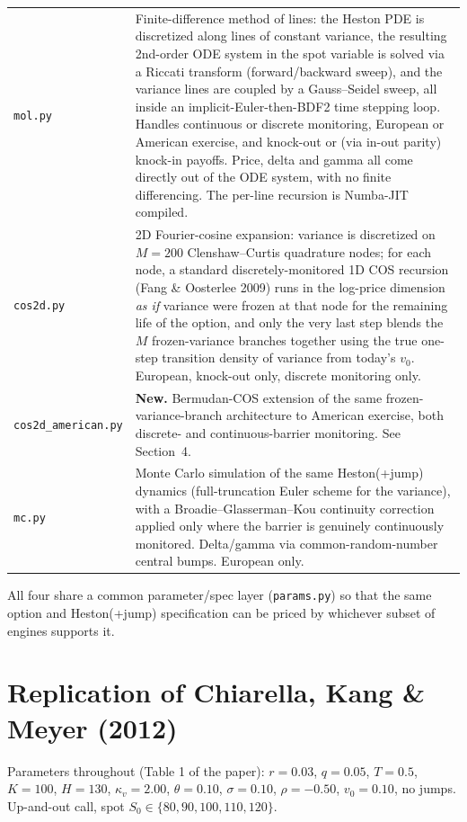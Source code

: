 \documentclass[11pt]{article}
\begin{document}
\begin{tabular}{@{}p{}p{}@{}}
\texttt{mol.py} & Finite-difference method of lines: the Heston PDE is
discretized along lines of constant variance, the resulting 2nd-order ODE
system in the spot variable is solved via a Riccati transform
(forward/backward sweep), and the variance lines are coupled by a
Gauss--Seidel sweep, all inside an implicit-Euler-then-BDF2 time stepping
loop. Handles continuous or discrete monitoring, European or American
exercise, and knock-out or (via in-out parity) knock-in payoffs. Price, delta
and gamma all come directly out of the ODE system, with no finite
differencing. The per-line recursion is Numba-JIT compiled. \\[0.5em]
\texttt{cos2d.py} & 2D Fourier-cosine expansion: variance is discretized on
$M{=}200$ Clenshaw--Curtis quadrature nodes; for each node, a standard
discretely-monitored 1D COS recursion (Fang \& Oosterlee 2009) runs in the
log-price dimension \emph{as if} variance were frozen at that node for the
remaining life of the option, and only the very last step blends the $M$
frozen-variance branches together using the true one-step transition density
of variance from today's $v_0$. European, knock-out only, discrete monitoring
only. \\[0.5em]
\texttt{cos2d\_american.py} & \textbf{New.} Bermudan-COS extension of the
same frozen-variance-branch architecture to American exercise, both discrete-
and continuous-barrier monitoring. See Section~4. \\[0.5em]
\texttt{mc.py} & Monte Carlo simulation of the same Heston(+jump) dynamics
(full-truncation Euler scheme for the variance), with a Broadie--Glasserman--Kou
continuity correction applied only where the barrier is genuinely continuously
monitored. Delta/gamma via common-random-number central bumps. European
only. \\
\end{tabular}

All four share a common parameter/spec layer (\texttt{params.py}) so that the
same option and Heston(+jump) specification can be priced by whichever subset
of engines supports it.

\section{Replication of Chiarella, Kang \& Meyer (2012)}

Parameters throughout (Table 1 of the paper): $r{=}0.03$, $q{=}0.05$,
$T{=}0.5$, $K{=}100$, $H{=}130$, $\kappa_v{=}2.00$, $\theta{=}0.10$,
$\sigma{=}0.10$, $\rho{=}-0.50$, $v_0{=}0.10$, no jumps. Up-and-out call,
spot $S_0 \in \{80,90,100,110,120\}$.
\end{document}
